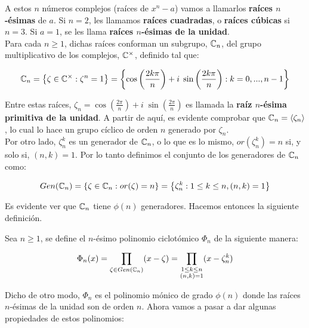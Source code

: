 A estos $n$ números complejos (raíces de $x^n - a$) vamos a llamarlos \textbf{raíces $n$-ésimas} de $a$. Si $n=2$, les llamamos \textbf{raíces cuadradas}, o \textbf{raíces cúbicas} si $n=3$. Si $a=1$, se les llama \textbf{raíces $n$-ésimas de la unidad}.\\

Para cada $n \geq 1$, dichas raíces conforman un subgrupo, $\mathbb{C}_n$, del grupo multiplicativo de los complejos, $\mathbb{C}^\times$, definido tal que:

\[ \mathbb{C}_n = \left\lbrace \zeta \in \mathbb{C}^\times : \zeta^n = 1 \right\rbrace = \left\lbrace \cos\left(\frac{2k\pi}{n}\right) + i\;\sin\left(\frac{2k\pi}{n}\right): k=0,...,n-1  \right\rbrace \]

Entre estas raíces, $\zeta_n = \cos\left(\frac{2\pi}{n}\right) + i\;\sin\left(\frac{2\pi}{n}\right)$ es llamada la \textbf{raíz $n$-ésima primitiva de la unidad}. A partir de aquí, es evidente comprobar que $\mathbb{C}_n = \left\langle \zeta_n \right\rangle$, lo cual lo hace un grupo cíclico de orden $n$ generado por $\zeta_n$.\\

Por otro lado, $\zeta_n^k$ es un generador de $\mathbb{C}_n$, o lo que es lo mismo, $or(\zeta_n^k) = n$ si, y solo si, $(n, k) = 1$. Por lo tanto definimos el conjunto de los generadores de $\mathbb{C}_n$ como:

\[ Gen(\mathbb{C}_n) = \left\lbrace \zeta \in \mathbb{C}_n : or(\zeta) = n \right\rbrace = \left\lbrace \zeta_n^k : 1 \leq k \leq n, (n, k) = 1 \right\rbrace \]

Es evidente ver que $\mathbb{C}_n$ tiene $\phi(n)$ generadores. Hacemos entonces la siguiente definición.

\begin{definicion}
	Sea $n \geq 1$, se define el $n$-ésimo polinomio ciclotómico $\Phi_n$ de la siguiente manera:
	
	\begin{equation}\label{formula_polinomio_ciclotomico}
	\Phi_n(x) = \prod_{\zeta \in Gen(\mathbb{C}_n)}(x - \zeta) = \prod_{\substack{1 \leq k \leq n \\ (n, k) = 1}}(x - \zeta_n^k)
	\end{equation}
\end{definicion}

Dicho de otro modo, $\Phi_n$ es el polinomio mónico de grado $\phi(n)$ donde las raíces $n$-ésimas de la unidad son de orden $n$. Ahora vamos a pasar a dar algunas propiedades de estos polinomios:

